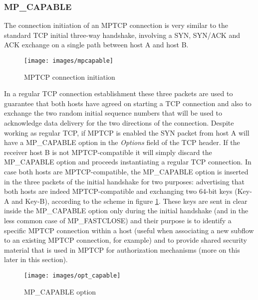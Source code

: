 \subsubsection{MP\_CAPABLE}
The connection initiation of an MPTCP connection is very similar to the standard TCP initial three-way handshake, involving a SYN, SYN/ACK and ACK exchange on a single path between host A and host B. 

\begin{figure}[!htb]
\centering
\texttt{[image: images/mpcapable]}
\caption{MPTCP connection initiation}
\label{fig:mpcapable}
\end{figure}

In a regular TCP connection establishment these three packets are used to guarantee that both hosts have agreed on starting a TCP connection and also to exchange the two random initial sequence numbers that will be used to acknowledge data delivery for the two directions of the connection. Despite working as regular TCP, if MPTCP is enabled the SYN packet from host A will have a MP\_CAPABLE option in the \textit{Options} field of the TCP header. If the receiver host B is not MPTCP-compatible it will simply discard the MP\_CAPABLE option and proceeds instantiating a regular TCP connection.
In case both hosts are MPTCP-compatible, the MP\_CAPABLE option is inserted in the three packets of the initial handshake for two purposes: advertising that both hosts are indeed MPTCP-compatible and exchanging two 64-bit keys (Key-A and Key-B), according to the scheme in figure \ref{fig:mpcapable}.
These keys are sent in clear inside the MP\_CAPABLE option only during the initial handshake (and in the less common case of MP\_FASTCLOSE) and their purpose is to identify a specific MPTCP connection within a host (useful when associating a new subflow to an existing MPTCP connection, for example) and to provide shared security material that is used in MPTCP for authorization mechanisms (more on this later in this section). 

\begin{figure}[!htb]
\centering
\texttt{[image: images/opt\_capable]}
\caption{MP\_CAPABLE option}
\label{fig:opt_capable}
\end{figure}

